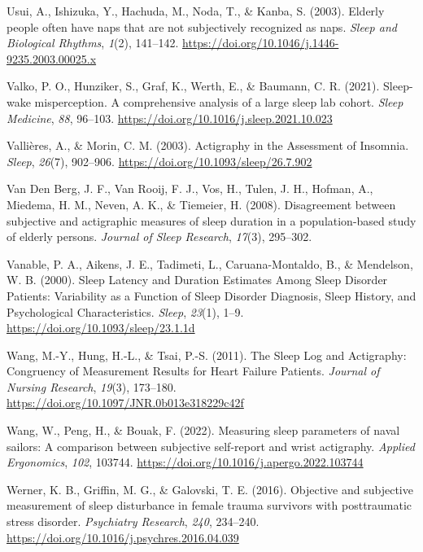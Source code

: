 \documentclass[
]{article}
\newlength{\cslhangindent}
\newenvironment{CSLReferences}[2] %
 {\begin{list}{}{%
  \setlength{\itemindent}{0pt}
  \setlength{\leftmargin}{0pt}
  \setlength{\parsep}{0pt}
  \ifodd #1
   \setlength{\leftmargin}{\cslhangindent}
   \setlength{\itemindent}{-1\cslhangindent}
  \fi
  \setlength{\itemsep}{#2\baselineskip}}}
 {\end{list}}
\begin{document}
\begin{CSLReferences}{1}{0}
Usui, A., Ishizuka, Y., Hachuda, M., Noda, T., \& Kanba, S. (2003). Elderly people often have naps that are not subjectively recognized as naps. \emph{Sleep and Biological Rhythms}, \emph{1}(2), 141--142. \url{https://doi.org/10.1046/j.1446-9235.2003.00025.x}

Valko, P. O., Hunziker, S., Graf, K., Werth, E., \& Baumann, C. R. (2021). Sleep-wake misperception. {A} comprehensive analysis of a large sleep lab cohort. \emph{Sleep Medicine}, \emph{88}, 96--103. \url{https://doi.org/10.1016/j.sleep.2021.10.023}

Vallières, A., \& Morin, C. M. (2003). Actigraphy in the {Assessment} of {Insomnia}. \emph{Sleep}, \emph{26}(7), 902--906. \url{https://doi.org/10.1093/sleep/26.7.902}

Van Den Berg, J. F., Van Rooij, F. J., Vos, H., Tulen, J. H., Hofman, A., Miedema, H. M., Neven, A. K., \& Tiemeier, H. (2008). Disagreement between subjective and actigraphic measures of sleep duration in a population-based study of elderly persons. \emph{Journal of Sleep Research}, \emph{17}(3), 295--302.

Vanable, P. A., Aikens, J. E., Tadimeti, L., Caruana-Montaldo, B., \& Mendelson, W. B. (2000). Sleep {Latency} and {Duration} {Estimates} {Among} {Sleep} {Disorder} {Patients}: {Variability} as a {Function} of {Sleep} {Disorder} {Diagnosis}, {Sleep} {History}, and {Psychological} {Characteristics}. \emph{Sleep}, \emph{23}(1), 1--9. \url{https://doi.org/10.1093/sleep/23.1.1d}

Wang, M.-Y., Hung, H.-L., \& Tsai, P.-S. (2011). The {Sleep} {Log} and {Actigraphy}: {Congruency} of {Measurement} {Results} for {Heart} {Failure} {Patients}. \emph{Journal of Nursing Research}, \emph{19}(3), 173--180. \url{https://doi.org/10.1097/JNR.0b013e318229c42f}

Wang, W., Peng, H., \& Bouak, F. (2022). Measuring sleep parameters of naval sailors: {A} comparison between subjective self-report and wrist actigraphy. \emph{Applied Ergonomics}, \emph{102}, 103744. \url{https://doi.org/10.1016/j.apergo.2022.103744}

Werner, K. B., Griffin, M. G., \& Galovski, T. E. (2016). Objective and subjective measurement of sleep disturbance in female trauma survivors with posttraumatic stress disorder. \emph{Psychiatry Research}, \emph{240}, 234--240. \url{https://doi.org/10.1016/j.psychres.2016.04.039}


\end{CSLReferences}
\end{document}
